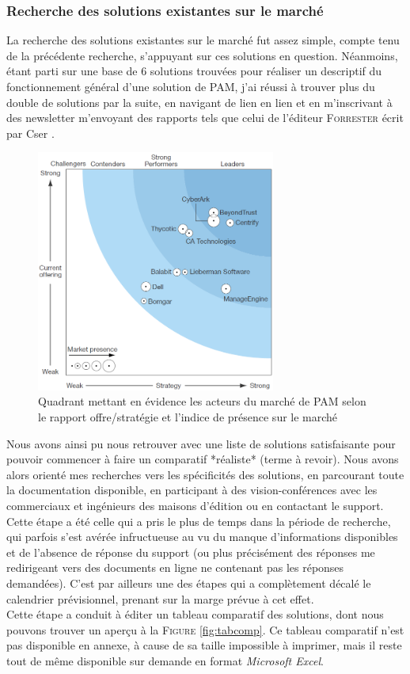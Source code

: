 \subsubsection{Recherche des solutions existantes sur le marché}
\label{par:sol_market}
La recherche des solutions existantes sur le marché fut assez simple, compte tenu de la précédente recherche, s'appuyant sur ces solutions en question. Néanmoins, étant parti sur une base de 6 solutions trouvées pour réaliser un descriptif du fonctionnement général d'une solution de PAM, j'ai réussi à trouver plus du double de solutions par la suite, en navigant de lien en lien et en m'inscrivant à des newsletter m'envoyant des rapports tels que celui de l'éditeur \textsc{Forrester} écrit par Cser \cite{acs}.

\begin{figure}[!ht]
    \center
    \includegraphics[width=0.7\textwidth]{./images/forrester_quadrant.png}
    \caption{Quadrant mettant en évidence les acteurs du marché de PAM selon le rapport offre/stratégie et l'indice de présence sur le marché}
\end{figure}

Nous avons ainsi pu nous retrouver avec une liste de solutions satisfaisante pour pouvoir commencer à faire un comparatif *réaliste* (terme à revoir). Nous avons alors orienté mes recherches vers les spécificités des solutions, en parcourant toute la documentation disponible, en participant à des vision-conférences avec les commerciaux et ingénieurs des maisons d'édition ou en contactant le support. Cette étape a été celle qui a pris le plus de temps dans la période de recherche, qui parfois s'est avérée infructueuse au vu du manque d'informations disponibles et de l'absence de réponse du support (ou plus précisément des réponses me redirigeant vers des documents en ligne ne contenant pas les réponses demandées). C'est par ailleurs une des étapes qui a complètement décalé le calendrier prévisionnel, prenant sur la marge prévue à cet effet.\\
Cette étape a conduit à éditer un tableau comparatif des solutions, dont nous pouvons trouver un aperçu à la \textsc{Figure }\ref{fig:tabcomp}. Ce tableau comparatif n'est pas disponible en annexe, à cause de sa taille impossible à imprimer, mais il reste tout de même disponible sur demande en format \emph{Microsoft Excel}.

